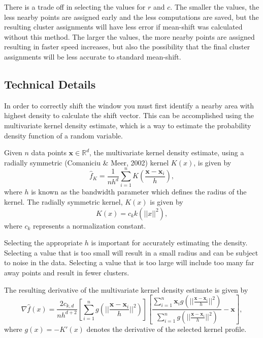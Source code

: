 \documentclass{article}
\begin{document}
There is a trade off in selecting the values for $r$ and $c$. The smaller the values, the less nearby points are assigned early and the less computations are saved, but the resulting cluster assignments will have less error if mean-shift was calculated without this method. The larger the values, the more nearby points are assigned resulting in faster speed increases, but also the possibility that the final cluster assignments will be less accurate to standard mean-shift.

\subsection{Technical Details}

In order to correctly shift the window you must first identify a nearby area with highest density to calculate the shift vector. This can be accomplished using the multivariate kernel density estimate, which is a way to estimate the probability density function of a random variable.

Given $n$ data points $\mathbf{x}\in\mathbb{R}^d$, the multivariate kernel density estimate, using a radially symmetric (Comaniciu \& Meer, 2002) kernel $K(x)$, is given by
\begin{equation}
\hat{f}_K=\frac{1}{nh^d}\sum_{i=1}^nK\left(\frac{\mathbf{x}-\mathbf{x}_i}{h}\right),
\end{equation}
where $h$ is known as the bandwidth parameter which defines the radius of the kernel. The radially symmetric kernel, $K(x)$ is given by
\begin{equation}
K(x)=c_kk(||x||^2),
\end{equation}
where $c_k$ represents a normalization constant.

Selecting the appropriate $h$ is important for accurately estimating the density. Selecting a value that is too small will result in a small radius and can be subject to noise in the data. Selecting a value that is too large will include too many far away points and result in fewer clusters.

The resulting derivative of the multivariate kernel density estimate is given by
\begin{equation}
\nabla\hat{f}(x)=\frac{2c_{k,d}}{nh^{d+2}}
\left[\sum_{i=1}^ng\left(||\frac{\mathbf{x}-\mathbf{x}_i}{h}||^2\right)\right]
\left[\frac{\sum_{i=1}^n\mathbf{x}_ig\left(||\frac{\mathbf{x}-\mathbf{x}_i}{h}||^2\right)}{\sum_{i=1}^ng\left(||\frac{\mathbf{x}-\mathbf{x}_i}{h}||^2\right)}-\mathbf{x}\right],
\end{equation}
where $g(x) = -K'(x)$ denotes the derivative of the selected kernel profile.
\end{document}
